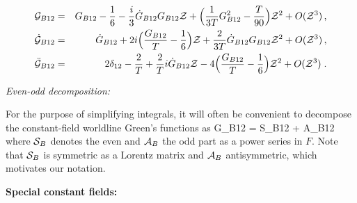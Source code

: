\documentclass[a4paper,11pt]{article}
\begin{document}
%
\begin{eqnarray}
{\cal G}_{B12} &=& {G}_{B12}-{1\over 6}
-{i\over 3}
\dot G_{B12}{G}_{B12}{\cal Z} + \Bigl({1\over 3T}{G}_{B12}^2
-{T\over 90}\Bigr){\cal Z}^2+O({\cal Z}^3) \, , \label{app-gd-GBexpand}\\
\dot{\cal G}_{B12} 
&=&\dot G_{B12}+2i\Bigl(\frac{G_{B12}}{T}-{1\over 6}\Bigr){\cal Z}
+{2\over 3T}\dot G_{B12}{G}_{B12}{\cal Z}^2 +  O({\cal Z}^3) 
\, ,
\label{app-gd-dGBexpand}\\
\ddot{\cal G}_{B12} 
&=& 2 \delta_{12} - \frac{2}{T} +\frac{2}{T}i\dot G_{B12}{\cal Z}
-4\Bigl(\frac{G_{B12}}{T}-{1\over 6}\Bigr){\cal Z}^2+O({\cal Z}^3)  \;.
\label{app-gd-ddGBexpand}
\end{eqnarray}


\medskip

\noindent
{\it Even-odd decomposition:}

For the purpose of simplifying integrals, 
it will often be convenient to decompose the constant-field worldline Green's functions as
%
\bear
{\cal G}_{B12} = {\cal S}_{B12} + {\cal A}_{B12}
\label{app-gd-evenoddcalGB}
\ear
where ${\cal S}_{B}$ denotes the even and ${\cal A}_{B}$ the odd part as a power series in $F$.
Note that ${\cal S}_B$ is symmetric as a Lorentz matrix and ${\cal A}_{B}$ antisymmetric, which motivates
our notation. 
%
%
\medskip

\noindent
{\bf Special constant fields:}
\end{document}
